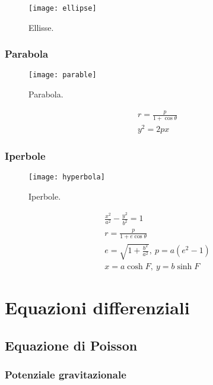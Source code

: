 \documentclass[oneside,12pt,fleqn]{memoir}
\begin{document}
\begin{figure}[!ht]
\centering
\texttt{[image: ellipse]}
\caption{Ellisse.}
\end{figure}

\clearpage


\subsection{Parabola}

\begin{figure}[!ht]
\centering
\texttt{[image: parable]}
\caption{Parabola.}
\end{figure}

\begin{align*}
&r=\frac{p}{1+\cos{\theta}}\\
&y^2=2px
\end{align*}

\clearpage

\subsection{Iperbole}

\begin{figure}[!ht]
\centering
\texttt{[image: hyperbola]}
\caption{Iperbole.}
\end{figure}

\begin{align*}
&\frac{x^2}{a^2}-\frac{y^2}{b^2}=1\\
&r=\frac{p}{1+e\cos{\theta}}\\
&e=\sqrt{1+\frac{b^2}{a^2}},\ p=a(e^2-1)\\
&x=a\cosh{F},\ y=b\sinh{F}
\end{align*}

\clearpage

\chapter{Equazioni differenziali}
\PartialToc

\section{Equazione di Poisson}

\subsection{Potenziale gravitazionale}
\end{document}
